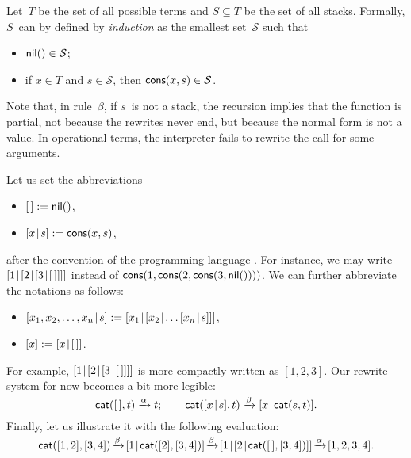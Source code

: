 Let~\(T\) be the set of all possible terms and \(S \subseteq T\) be
the set of all stacks. Formally, \(S\)~can by defined by
\emph{induction} as the smallest set~\(\mathcal{S}\) such
that
\begin{itemize}

  \item \(\textsf{nil}() \in \mathcal{S}\);\label{def:stack}

  \item if \(x \in T\) and \(s \in \mathcal{S}\), then
    \(\textsf{cons}(x,s) \in \mathcal{S}\).

\end{itemize}

Note that, in rule~\(\beta\), if \(s\)~is not a stack, the recursion
implies that the function  is partial, not because the
rewrites never end, but because the normal form is not a value. In operational terms, the
interpreter fails to rewrite the call for some arguments.

Let us set the abbreviations
\begin{itemize}

  \item \([\,] := \textsf{nil}()\),

  \item \([{x}\!\mid\!{s}] := \textsf{cons}(x,s)\),

\end{itemize}
after the convention of the programming language \Prolog
\citep{SterlingShapiro_1994,Bratko_2000}. For instance, we may write
\([{1}\!\mid\!{[{2}\!\mid\!{[{3}\!\mid\!{[\,]}]}]}]\) instead of
\(\textsf{cons}(1,\textsf{cons}(2,\textsf{cons}(3,\textsf{nil}())))\).  We can
further abbreviate the notations as follows:
\begin{itemize}

  \item \(\cons{x_1,x_2,\dots,x_n}{s} := \cons{x_1}{\cons{x_2}{\dots
      \cons{x_n}{s}}}\),

  \item \([x] := [{x}\!\mid\!{[\,]}]\).

\end{itemize}
For example, \([{1}\!\mid\!{[{2}\!\mid\!{[{3}\!\mid\!{[\,]}]}]}]\) is more compactly
written as \([1,2,3]\). Our rewrite system for
 now becomes a bit more legible:
\begin{equation}
\fun{cat}(        \el,t) \xrightarrow{\smash{\alpha}} t;\qquad
\fun{cat}(\cons{x}{s},t) \xrightarrow{\smash{\beta}}
\cons{x}{\fun{cat}(s,t)}.
\label{def:cat}\index{stack!concatenation!definition}
\end{equation}
Finally, let us illustrate it with the following
evaluation:
\begin{equation*}
\fun{cat}([1,2],[3,4])
\!\xrightarrow{\smash{\beta}}\!
\cons{1}{\fun{cat}([2],[3,4])}
\!\xrightarrow{\smash{\beta}}\!
\cons{1}{\cons{2}{\fun{cat}(\el,[3,4])}}
\!\xrightarrow{\smash{\alpha}}\!
[1,2,3,4].
\end{equation*}

